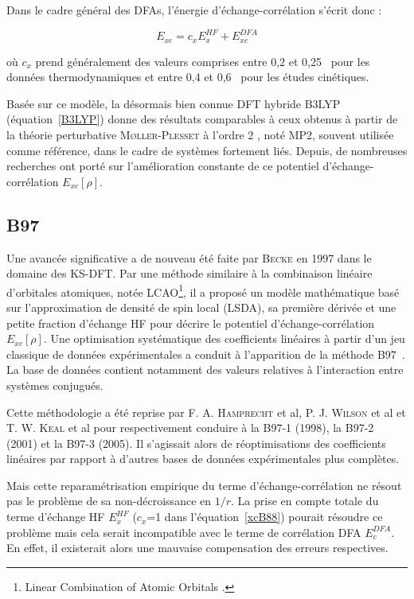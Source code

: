 {{Dans le cadre général des DFAs, l'énergie d'échange-corrélation s'écrit donc :

\begin{equation}
E_{xc} = c_{x}E_{x}^{HF} + E_{xc}^{DFA}
\label{xcB88}
\end{equation}

\noindent où $c_{x}$ prend généralement des valeurs comprises entre 0,2 et 0,25~\cite{becke1993density} pour les données thermodynamiques et entre 0,4 et 0,6~\cite{boese2004development} pour les études cinétiques.

Basée sur ce modèle, la désormais bien connue DFT hybride B3LYP \cite{becke1993density} (équation~\ref{B3LYP}) donne des résultats comparables à ceux obtenus à partir de la théorie perturbative \textsc{M\o ller-Plesset} à l'ordre 2 \cite{moller1934note}, noté MP2, souvent utilisée comme référence, dans le cadre de systèmes fortement liés. Depuis, de nombreuses recherches ont porté sur l'amélioration constante de ce potentiel d'échange-corrélation $E_{xc}[\rho]$.

\subsection{B97}

Une avancée significative a de nouveau été faite par \textsc{Becke} en 1997 dans le domaine des KS-DFT. Par une méthode similaire à la combinaison linéaire d'orbitales atomiques, notée LCAO\footnote{\og Linear Combination of Atomic Orbitals \fg{}.}, il a proposé un modèle mathématique basé sur l'approximation de densité de spin local (LSDA), sa première dérivée et une petite fraction d'échange HF pour décrire le potentiel d'échange-corrélation $E_{xc}[\rho]$. Une optimisation systématique des coefficients linéaires à partir d'un jeu classique de données expérimentales a conduit à l'apparition de la méthode B97~\cite{becke1997density}. La base de données contient notamment des valeurs relatives à l'interaction entre systèmes conjugués.

Cette méthodologie a été reprise par F. A. \textsc{Hamprecht} et al, P. J. \textsc{Wilson} et al et T. W. \textsc{Keal} et al pour respectivement conduire à la B97-1 \cite{hamprecht1998development} (1998), la B97-2 \cite{wilson2001hybrid} (2001) et la B97-3 \cite{keal2005semiempirical} (2005). Il s'agissait alors de réoptimisations des coefficients linéaires par rapport à d'autres bases de données expérimentales plus complètes.

Mais cette reparamétrisation empirique du terme d'échange-corrélation ne résout pas le problème de sa non-décroissance en $1/r$. La prise en compte totale du terme d'échange HF $E_{x}^{HF}$ ($c_{x}$=1 dans l'équation~\ref{xcB88}) pourait résoudre ce problème mais cela serait incompatible avec le terme de corrélation DFA $E_{c}^{DFA}$. En effet, il existerait alors une mauvaise compensation des erreurs respectives.

}}
